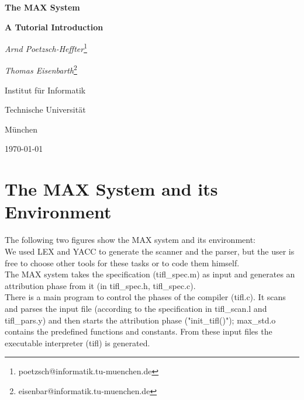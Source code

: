 

\textwidth16.5cm

\sloppy


\begin{titlepage}

\vspace*{4cm}

\centerline{\huge\bf The MAX System} 

\vspace*{.5cm}

\centerline{\huge\bf A Tutorial Introduction}

\vspace*{2cm}

\centerline{ {\em Arnd Poetzsch-Heffter}\footnote{poetzsch@informatik.tu-muenchen.de} }
\centerline{ {\em Thomas Eisenbarth}\footnote{eisenbar@informatik.tu-muenchen.de} }

\vspace*{1cm}

\centerline{Institut f\"ur Informatik}
\centerline{Technische Universit\"at}
\centerline{M\"unchen}

\vspace*{2cm}

\centerline{\today}

\end{titlepage}


\tableofcontents








\appendix
\chapter{The MAX System and its Environment}
The following two figures show the MAX system and its environment:
\\

\noindent
We used LEX and YACC to generate the scanner and the parser, but the user is free to choose other tools for these tasks or to code them himself.\\
The MAX system takes the specification (tifl\_spec.m) as input and generates an attribution phase from it (in tifl\_spec.h, tifl\_spec.c).\\
There is a main program to control the phases of the compiler (tifl.c). It scans and parses the input file (according to the specification in tifl\_scan.l and tifl\_pars.y) and then starts the attribution phase ("init\_tifl()"); max\_std.o contains the predefined functions and constants. From these input files
the executable interpreter (tifl) is generated.


